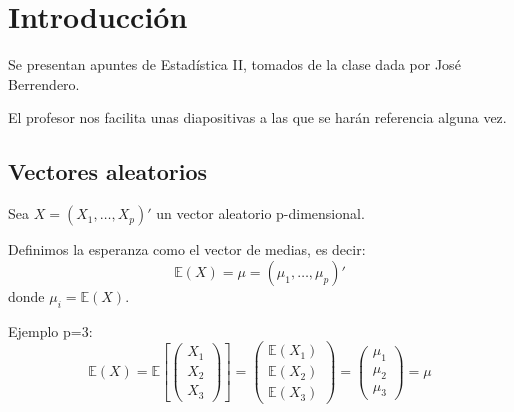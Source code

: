 \section{Introducción}
Se presentan apuntes de Estadística II, tomados de la clase dada por José Berrendero.

El profesor nos facilita unas diapositivas a las que se harán referencia alguna vez. 

\subsection{Vectores aleatorios}


Sea $X = (X_1, \dots , X_p)'$ un vector aleatorio p-dimensional.


\begin{defn}[Esperanza]
	Definimos la esperanza como el vector de medias, es decir:
	\[
	\mathbb{E}(X) = μ = (μ_1,\dots,μ_p)'
	\]
	donde $μ_i = \mathbb{E}(X)$.
\end{defn}


Ejemplo p=3:
\[
\mathbb{E}(X)=
\mathbb{E}\left[ \left( \begin{array}{c} X_1\\ X_2\\ X_3 \end{array} \right) \right]=
\left( \begin{array}{c} \mathbb{E}(X_1)\\ \mathbb{E}(X_2)\\ \mathbb{E}(X_3) \end{array} \right)=
\left( \begin{array}{c} \mu_1\\ \mu_2\\ \mu_3 \end{array} \right)= \mu
\]


